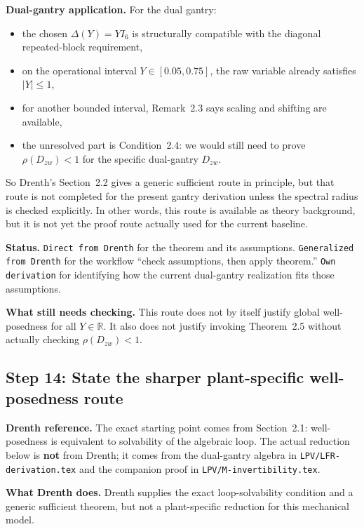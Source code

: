 \documentclass[11pt]{article}
\newcommand{\R}{\mathbb{R}}
\newcommand{\audititem}[2]{\par\smallskip\noindent\textbf{#1.} #2\par}
\newcommand{\statusline}[1]{\texttt{#1}}
\begin{document}
\audititem{Dual-gantry application}{For the dual gantry:
\begin{itemize}[leftmargin=1.2em]
    \item the chosen $\Delta(Y)=YI_6$ is structurally compatible with the
    diagonal repeated-block requirement,
    \item on the operational interval $Y \in [0.05,0.75]$, the raw variable
    already satisfies $|Y| \leq 1$,
    \item for another bounded interval, Remark~2.3 says scaling and shifting are
    available,
    \item the unresolved part is Condition~2.4: we would still need to prove
    $\rho(D_{zw}) < 1$ for the specific dual-gantry $D_{zw}$.
\end{itemize}
So Drenth's Section~2.2 gives a generic sufficient route in principle, but that
route is not completed for the present gantry derivation unless the spectral
radius is checked explicitly. In other words, this route is available as theory
background, but it is not yet the proof route actually used for the current
baseline.}

\audititem{Status}{\statusline{Direct from Drenth} for the theorem and its
assumptions. \statusline{Generalized from Drenth} for the workflow
``check assumptions, then apply theorem.'' \statusline{Own derivation} for
identifying how the current dual-gantry realization fits those assumptions.}

\audititem{What still needs checking}{This route does not by itself justify
global well-posedness for all $Y \in \R$. It also does not justify invoking
Theorem~2.5 without actually checking $\rho(D_{zw}) < 1$.}

\subsection{Step 14: State the sharper plant-specific well-posedness route}

\audititem{Drenth reference}{The exact starting point comes from Section~2.1:
well-posedness is equivalent to solvability of the algebraic loop. The actual
reduction below is \textbf{not} from Drenth; it comes from the dual-gantry
algebra in \texttt{LPV/LFR-derivation.tex} and the companion proof in
\texttt{LPV/M-invertibility.tex}.}

\audititem{What Drenth does}{Drenth supplies the exact loop-solvability
condition and a generic sufficient theorem, but not a plant-specific reduction
for this mechanical model.}
\end{document}
